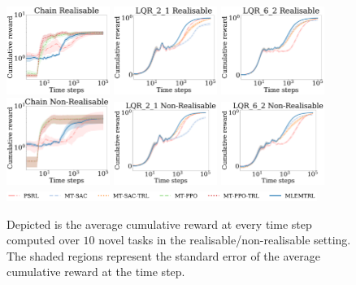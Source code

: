 \begin{figure}[t!]
    \centering
    \includegraphics[width=0.3\textwidth]{img/chain_realisable.pdf}         
    \includegraphics[width=0.3\textwidth]{img/lqr_2_1_realisable.pdf} 
    \includegraphics[width=0.3\textwidth]{img/lqr_6_2_realisable.pdf}\\
    \includegraphics[width=0.3\textwidth]{img/chain_non_realisable.pdf}        
    \includegraphics[width=0.3\textwidth]{img/lqr_2_1_non_realisable.pdf} 
    \includegraphics[width=0.3\textwidth]{img/lqr_6_2_non_realisable.pdf}\\
    \includegraphics[width=0.9\textwidth]{img/lqr_legend.pdf}
    \caption{Depicted is the average cumulative reward at every time step computed over $10$ novel tasks in the realisable/non-realisable setting. The shaded regions represent the standard error of the average cumulative reward at the time step.}\label{fig:full_results}%
\end{figure}

